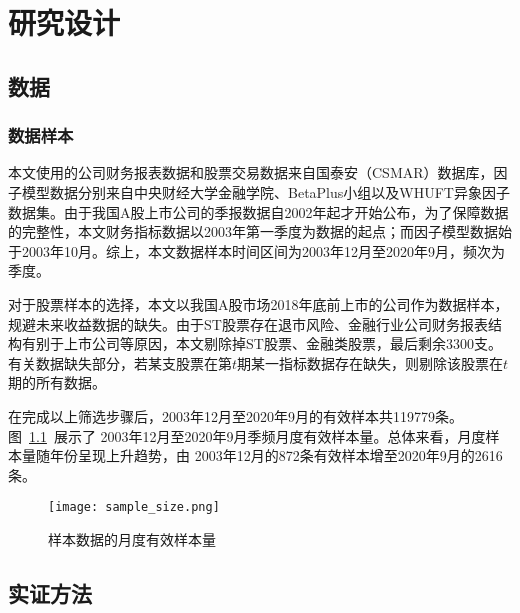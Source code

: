 
\chapter{研究设计}
\section{数据}
\subsection{数据样本}
本文使用的公司财务报表数据和股票交易数据来自国泰安（CSMAR）数据库，因子模型数据分别来自中央财经大学金融学院、BetaPlus小组以及WHUFT异象因子数据集。由于我国A股上市公司的季报数据自2002年起才开始公布，为了保障数据的完整性，本文财务指标数据以2003年第一季度为数据的起点；而因子模型数据始于2003年10月。综上，本文数据样本时间区间为2003年12月至2020年9月，频次为季度。

对于股票样本的选择，本文以我国A股市场2018年底前上市的公司作为数据样本，规避未来收益数据的缺失。由于ST股票存在退市风险、金融行业公司财务报表结构有别于上市公司等原因，本文剔除掉ST股票、金融类股票，最后剩余3300支。有关数据缺失部分，若某支股票在第$t$期某一指标数据存在缺失，则剔除该股票在$t$期的所有数据。

在完成以上筛选步骤后，2003年12月至2020年9月的有效样本共119779条。图~\ref{size}~展示了 2003年12月至2020年9月季频月度有效样本量。总体来看，月度样本量随年份呈现上升趋势，由 2003年12月的872条有效样本增至2020年9月的2616条。

\begin{figure}[htbp]
  \centering
    \texttt{[image: sample\_size.png]}
    \caption{样本数据的月度有效样本量}
    \label{size}
\end{figure}

\section{实证方法}
